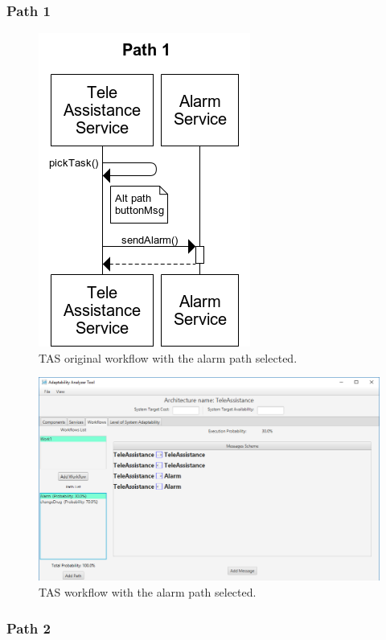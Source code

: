 \subsubsection{Path 1}
\begin{figure}[ht]
	\centerline
	{\includegraphics[scale=0.6]{img/TeleAssistanceOrigPath1.png}}
	\caption[TAS Original Workflow Path Alarm]{TAS original workflow with the alarm path selected.}
	\label{fig:tas-or-path1}
\end{figure}

\begin{figure}[ht]
	\centerline
	{\includegraphics[scale=0.55]{img/TeleAssistancePath1.png}}
	\caption[TAS Workflow Path Alarm]{TAS workflow with the alarm path selected.}
	\label{fig:tas-path1}
\end{figure}

\clearpage
\subsubsection{Path 2}

